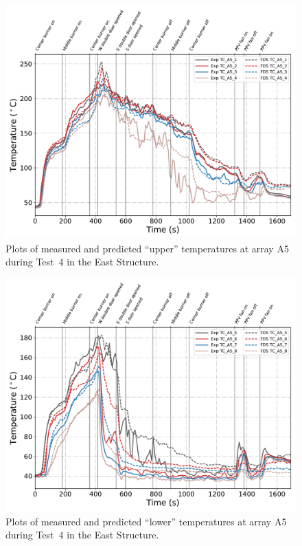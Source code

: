 \clearpage
\begin{figure}[p]
	\centering
	\includegraphics[width=\columnwidth]{Figures/Plots/Validation/Temperature/Test_4_TC_A5_upper}
	\caption{Plots of measured and predicted ``upper'' temperatures at array A5 during Test~4 in the East Structure.}
	\label{fig:TCA5_upper_data_Test4}
\end{figure}
\begin{figure}[p]
	\centering
	\includegraphics[width=\columnwidth]{Figures/Plots/Validation/Temperature/Test_4_TC_A5_lower}
	\caption{Plots of measured and predicted ``lower'' temperatures at array A5 during Test~4 in the East Structure.}
	\label{fig:TCA5_lower_data_Test4}
\end{figure}

